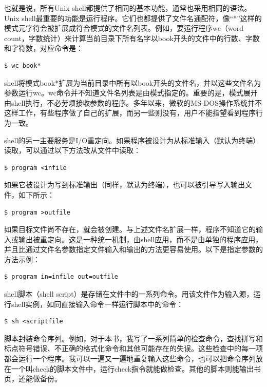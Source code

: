 \documentclass[a4paper,12pt,UTF8,twoside]{ctexbook}
\begin{document}
也就是说，所有Unix shell都提供了相同的基本功能，通常也采用相同的语法。Unix shell最重要的功能是运行程序。它们也都提供了文件名通配符，像“*”这样的模式元字符会被扩展成符合模式的文件名列表。例如，要运行程序wc（word count，字数统计）来计算当前目录下所有名字以book开头的文件中的行数、字数和字符数，对应命令是：

\begin{lstlisting}
$ wc book*
\end{lstlisting}

shell将模式book*扩展为当前目录中所有以book开头的文件名，并以这些文件名为参数运行wc。wc命令并不知道文件名列表是由模式指定的。重要的是，模式展开由shell执行，不必劳烦接收参数的程序。多年以来，微软的MS-DOS操作系统并不这样工作，有些程序做了自己的扩展，而另一些则没有，用户不能指望看到程序行为一致。

shell的另一主要服务是I/O重定向。如果程序被设计为从标准输入（默认为终端）读取，可以通过以下方法改从文件中读取：

\begin{lstlisting}
$ program <infile
\end{lstlisting}

如果它被设计为写到标准输出（同样，默认为终端），也可以被引导写入输出文件，如下所示：

\begin{lstlisting}
$ program >outfile
\end{lstlisting}

如果目标文件尚不存在，就会被创建。与上述文件名扩展一样，程序不知道它的输入或输出被重定向。这是一种统一机制，由shell应用，而不是由单独的程序应用，并且比通过文件名参数指定文件输入和输出的方法更容易使用。以下是指定参数的方法示例：

\begin{lstlisting}
$ program in=infile out=outfile
\end{lstlisting}

shell脚本（shell script）是存储在文件中的一系列命令。用该文件作为输入源，运行shell实例，如同直接输入命令一样运行脚本中的命令：

\begin{lstlisting}
$ sh <scriptfile
\end{lstlisting}

脚本封装命令序列。例如，对于本书，我写了一系列简单的检查命令，查找拼写和标点符号错误、不正确的格式化命令和其他可能存在的失误。这些检查中的每一项都会运行一个程序。我可以一遍又一遍地重复输入这些命令，也可以把命令序列放在一个叫check的脚本文件中，运行check指令就能做检查。其他的脚本则能输出书页，还能做备份。
\end{document}

